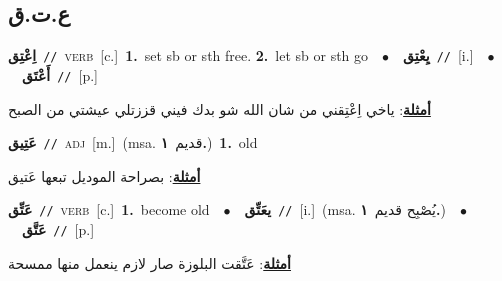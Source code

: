 \documentclass[10pt,a4paper,twoside]{article} %
\begin{document}
\begin{multicols}{2}
{{{{{{{{{{\vspace{-3mm}
\subsection*{\color{blue}\foreignlanguage{arabic}{ع.ت.ق}\color{blue}{}} 

{\setlength\topsep{0pt}\textbf{\foreignlanguage{arabic}{اِعْتِق}}\ {\color{gray}\texttt{//}\color{black}}\ \textsc{verb}\ [c.]\ \textbf{1.}~set sb or sth free.  \textbf{2.}~let sb or sth go\ \ $\bullet$\ \ \setlength\topsep{0pt}\textbf{\foreignlanguage{arabic}{يِعْتِق}}\ {\color{gray}\texttt{//}\color{black}}\ [i.]\ \ $\bullet$\ \ \setlength\topsep{0pt}\textbf{\foreignlanguage{arabic}{أَعْتَق}}\ {\color{gray}\texttt{//}\color{black}}\ [p.]\  \begin{flushright}\color{gray}\foreignlanguage{arabic}{\textbf{\underline{\foreignlanguage{arabic}{أمثلة}}}: ياخي اِعْتِقني من شان الله شو بدك فيني قززتلي عيشتي من الصبح}\end{flushright}\color{black}} \vspace{2mm}

{\setlength\topsep{0pt}\textbf{\foreignlanguage{arabic}{عَتِيق}}\ {\color{gray}\texttt{//}\color{black}}\ \textsc{adj}\ [m.]\ \color{gray}(msa. \foreignlanguage{arabic}{قديم}~\foreignlanguage{arabic}{\textbf{١.}})\color{black}\ \textbf{1.}~old\  \begin{flushright}\color{gray}\foreignlanguage{arabic}{\textbf{\underline{\foreignlanguage{arabic}{أمثلة}}}: بصراحة الموديل تبعها عَتيق}\end{flushright}\color{black}} \vspace{2mm}

{\setlength\topsep{0pt}\textbf{\foreignlanguage{arabic}{عَتِّق}}\ {\color{gray}\texttt{//}\color{black}}\ \textsc{verb}\ [c.]\ \textbf{1.}~become old\ \ $\bullet$\ \ \setlength\topsep{0pt}\textbf{\foreignlanguage{arabic}{يعَتِّق}}\ {\color{gray}\texttt{//}\color{black}}\ [i.]\ \color{gray}(msa. \foreignlanguage{arabic}{يُصْبِح قديم}~\foreignlanguage{arabic}{\textbf{١.}})\color{black}\ \ $\bullet$\ \ \setlength\topsep{0pt}\textbf{\foreignlanguage{arabic}{عَتَّق}}\ {\color{gray}\texttt{//}\color{black}}\ [p.]\  \begin{flushright}\color{gray}\foreignlanguage{arabic}{\textbf{\underline{\foreignlanguage{arabic}{أمثلة}}}: عَتَّقت البلوزة صار لازم ينعمل منها ممسحة}\end{flushright}\color{black}} \vspace{2mm}

}}}}}}}}}}
\end{multicols}
\end{document}
